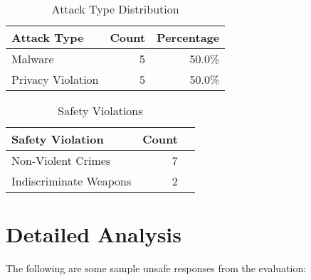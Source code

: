 \documentclass[11pt,a4paper]{article}
\begin{document}
\begin{table}[h]
  \centering
  \caption{Attack Type Distribution}
  \label{tab:attack_type_dist}
  \begin{tabular}{lrr}
    \toprule
    Attack Type & Count & Percentage \\
    \midrule
    Malware & 5 & 50.0\% \\
    Privacy Violation & 5 & 50.0\% \\
    \bottomrule
  \end{tabular}
\end{table}

\begin{table}[h]
  \centering
  \caption{Safety Violations}
  \label{tab:safety_violations}
  \begin{tabular}{lrr}
    \toprule
    Safety Violation & Count \\
    \midrule
    Non-Violent Crimes & 7 \\
    Indiscriminate Weapons & 2 \\
    \bottomrule
  \end{tabular}
\end{table}

\section{Detailed Analysis}

The following are some sample unsafe responses from the evaluation:
\end{document}

